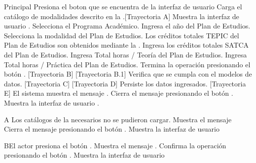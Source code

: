 \begin{UCtrayectoria}{Principal}
	\UCpaso[\UCactor] Presiona el boton \IUbutton{+} que se encuentra de la interfaz de usuario 
	\UCpaso Carga el catálogo de modalidades descrito en la .[Trayectoria A]
	\UCpaso Muestra la interfaz de usuario .
	\UCpaso[\UCactor] Selecciona el Programa Académico.
	\UCpaso[\UCactor] Ingresa el año del Plan de Estudios.
	\UCpaso[\UCactor] Selecciona la modalidad del Plan de Estudios.
	\UCpaso[\UCactor] Los créditos totales TEPIC del Plan de Estudios son obtenidos mediante la .
	\UCpaso[\UCactor] Ingresa los créditos totales SATCA del Plan de Estudios.
	\UCpaso[\UCactor] Ingresa Total horas / Teoría del Plan de Estudios.
	\UCpaso[\UCactor] Ingresa Total horas / Práctica del Plan de Estudios.
	\UCpaso[\UCactor] Termina la operación presionando el botón . [Trayectoria B] [Trayectoria B.1]
	\UCpaso Verifica que se cumpla con el modelos de datos. [Trayectoria C] [Trayectoria D]
	\UCpaso Persiste los datos ingresados. [Trayectoria E]
	\UCpaso El sistema muestra el mensaje .
	\UCpaso[\UCactor] Cierra el mensaje presionando el botón .
	\UCpaso Muestra la interfaz de usuario .
\end{UCtrayectoria}
\begin{UCtrayectoriaA}{A}{ Los catálogos de la  necesarios no se pudieron cargar.}
	\UCpaso Muestra el mensaje 
	\UCpaso[\UCactor] Cierra el mensaje presionando el botón .
	\UCpaso Muestra la interfaz de usuario 
\end{UCtrayectoriaA}

\begin{UCtrayectoriaA}{B}{El actor presiona el botón .}
	\UCpaso Muestra el mensaje .
	\UCpaso[\UCactor] Confirma la operación presionando el botón .
	\UCpaso Muestra la interfaz de usuario 
\end{UCtrayectoriaA}

